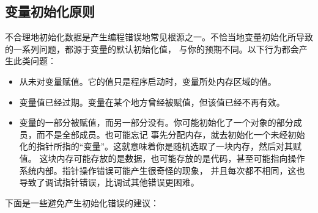 \documentclass{article}
\begin{document}
\subsection{变量初始化原则}
不合理地初始化数据是产生编程错误地常见根源之一。不恰当地变量初始化所导致的一系列问题，都源于变量的默认初始化值，
与你的预期不同。以下行为都会产生此类问题：
\begin{itemize}
    \item 从未对变量赋值。它的值只是程序启动时，变量所处内存区域的值。
    \item 变量值已经过期。变量在某个地方曾经被赋值，但该值已经不再有效。
    \item 变量的一部分被赋值，而另一部分没有。你可能初始化了一个对象的部分成员，而不是全部成员。也可能忘记
    事先分配内存，就去初始化一个未经初始化的指针所指的“变量”。这就意味着你是随机选取了一块内存，然后对其赋值。
    这块内存可能存放的是数据，也可能存放的是代码，甚至可能指向操作系统内部。指针操作错误可能产生很奇怪的现象，
    并且每次都不相同，这也导致了调试指针错误，比调试其他错误更困难。
\end{itemize}
下面是一些避免产生初始化错误的建议：
\end{document}
